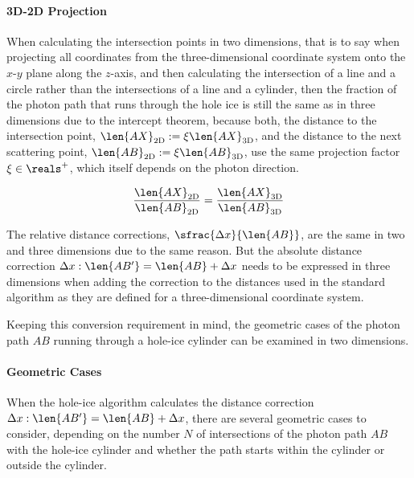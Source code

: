 \paragraph{3D-2D Projection}
When calculating the intersection points in two dimensions, that is to say when projecting all coordinates from the three-dimensional coordinate system onto the $x$-$y$ plane along the $z$-axis, and then calculating the intersection of a line and a circle rather than the intersections of a line and a cylinder, then the fraction of the photon path that runs through the hole ice is still the same as in three dimensions due to the intercept theorem, because both, the distance to the intersection point, $\len{AX}_\text{2D}:=\xi \len{AX}_\text{3D}$, and the distance to the next scattering point, $\len{AB}_\text{2D}:=\xi \len{AB}_\text{3D}$, use the same projection factor $\xi \in \reals^+$, which itself depends on the photon direction.

$$
  \frac{\len{AX}_\text{2D}}{\len{AB}_\text{2D}} = \frac{\len{AX}_\text{3D}}{\len{AB}_\text{3D}}
$$

The relative distance corrections, $\sfrac{\Delta x}{\len{AB}}$, are the same in two and three dimensions due to the same reason. But the absolute distance correction $\Delta x : \len{AB'} = \len{AB} + \Delta x$ needs to be expressed in three dimensions when adding the correction to the distances used in the standard algorithm as they are defined for a three-dimensional coordinate system.

Keeping this conversion requirement in mind, the geometric cases of the photon path $AB$ running through a hole-ice cylinder can be examined in two dimensions.

\paragraph{Geometric Cases}
%
When the hole-ice algorithm calculates the distance correction $\Delta x: \len{AB'} = \len{AB} + \Delta x$, there are several geometric cases to consider, depending on the number $N$ of intersections of the photon path $AB$ with the hole-ice cylinder and whether the path starts within the cylinder or outside the cylinder.

